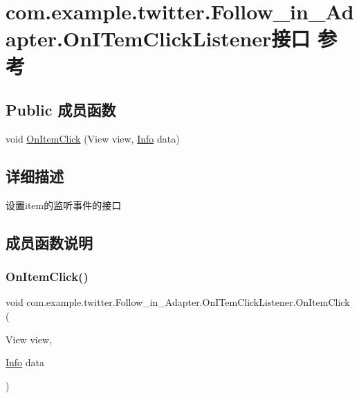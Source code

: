 \hypertarget{interfacecom_1_1example_1_1twitter_1_1_follow__in___adapter_1_1_on_i_tem_click_listener}{}\section{com.\+example.\+twitter.\+Follow\+\_\+in\+\_\+\+Adapter.\+On\+I\+Tem\+Click\+Listener接口 参考}
\label{interfacecom_1_1example_1_1twitter_1_1_follow__in___adapter_1_1_on_i_tem_click_listener}
\subsection*{Public 成员函数}
\begin{DoxyCompactItemize}
\item 
void \mbox{\hyperlink{interfacecom_1_1example_1_1twitter_1_1_follow__in___adapter_1_1_on_i_tem_click_listener_a11d25273ee68b8f7a4641dd466bddc36}{On\+Item\+Click}} (View view, \mbox{\hyperlink{classcom_1_1example_1_1twitter_1_1_info}{Info}} data)
\end{DoxyCompactItemize}


\subsection{详细描述}
设置item的监听事件的接口 

\subsection{成员函数说明}
\mbox{\label{interfacecom_1_1example_1_1twitter_1_1_follow__in___adapter_1_1_on_i_tem_click_listener_a11d25273ee68b8f7a4641dd466bddc36}} 
\subsubsection{\texorpdfstring{On\+Item\+Click()}{OnItemClick()}}
{\footnotesize\ttfamily void com.\+example.\+twitter.\+Follow\+\_\+in\+\_\+\+Adapter.\+On\+I\+Tem\+Click\+Listener.\+On\+Item\+Click (\begin{DoxyParamCaption}\item[{View}]{view,  }\item[{\mbox{\hyperlink{classcom_1_1example_1_1twitter_1_1_info}{Info}}}]{data }\end{DoxyParamCaption})}

